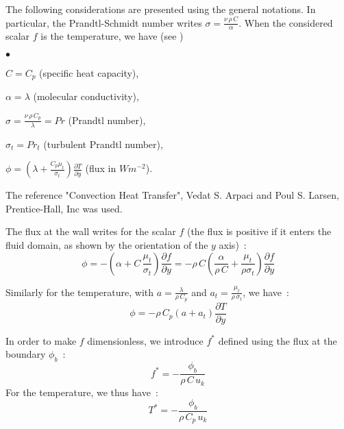 The following considerations are presented using the general notations.
In particular, the Prandtl-Schmidt number writes
$\sigma=\displaystyle\frac{\nu\,\rho\,C}{\alpha}$.
When the considered scalar $f$ is the temperature,
we have (see )
\begin{list}{$\bullet$}{}
\item $C=C_p$ (specific heat capacity),
\item $\alpha=\lambda$ (molecular conductivity),
\item $\sigma = \displaystyle\frac{\nu\,\rho\,C_p}{\lambda} = Pr$
       (Prandtl number),
\item $\sigma_t = Pr_t$ (turbulent Prandtl number),
\item $\phi=\left(\lambda+\displaystyle\frac{C_p\mu_t}{\sigma_t}\right)
        \displaystyle\frac{\partial T}{\partial y}$ (flux in $Wm^{-2}$).
\end{list}

The reference "Convection Heat Transfer",
Vedat S. Arpaci and Poul S. Larsen, Prentice-Hall, Inc was used.

The flux at the wall writes for the scalar $f$ (the flux is positive
if it enters the fluid domain, as shown by the orientation of the
$y$ axis)~:
\begin{equation}\label{Base_Clptur_Eq_Flux_scalaire}
\phi = -\left(\alpha+C\,\frac{\mu_t}{\sigma_t}\right)
                  \frac{\partial f}{\partial y}
     = -\rho\,C \left(\displaystyle\frac{\alpha}{\rho\,C}+
                                \frac{\mu_t}{\rho\sigma_t}\right)
                  \frac{\partial f}{\partial y}
\end{equation}

Similarly for the temperature, with
 $a=\displaystyle\frac{\lambda}{\rho\,C_p}$ and
$a_t=\displaystyle\frac{\mu_t}{\rho\,\sigma_t}$,
we have~:
\begin{equation}
\phi = -\rho\,C_p(a+a_t)\frac{\partial T}{\partial y}
\end{equation}

In order to make $f$ dimensionless, we introduce $f^*$ defined using
the flux at the boundary  $\phi_b$~:
\begin{equation}
f^* = -\displaystyle\frac{\phi_b}{\rho\,C\,u_k}
\end{equation}
For the temperature, we thus have~:
\begin{equation}
T^* = -\displaystyle\frac{\phi_b}{\rho\,C_p\,u_k}
\end{equation}

